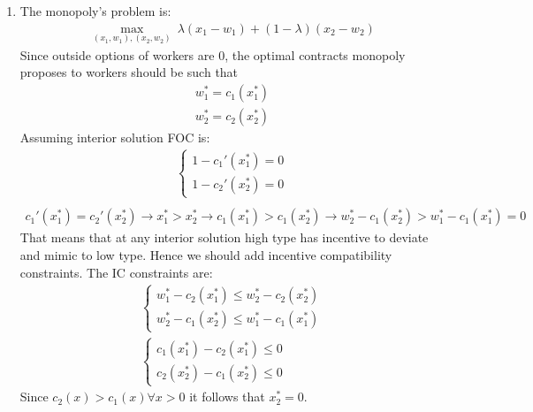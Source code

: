 \documentclass[a4paper]{article}
\begin{document}
\begin{enumerate}
	\item The monopoly's problem is:
	\begin{align*}
	\underset{(x_1, w_1), (x_2, w_2)}{\max}\ \lambda(x_1 - w_1) + (1 - \lambda)(x_2 - w_2)
	\end{align*}
	Since outside options of workers are 0, the optimal contracts monopoly proposes to workers should be such that
	\begin{align*}
	w_1^* = c_1(x_1^*)\\
	w_2^* = c_2(x_2^*)
	\end{align*}
	Assuming interior solution FOC is:
	\begin{align*}
	\begin{cases}
	1 - c_1'(x_1^*) = 0\\
	1 - c_2'(x_2^*) = 0
	\end{cases}\\
	\end{align*}
	\begin{align*}
	c_1'(x_1^*) = c_2'(x_2^*) \to x_1^* > x_2^* \to c_1(x_1^*) > c_1(x_2^*) \to w_2^* - c_1(x_2^*) > w_1^* - c_1(x_1^*) = 0
	\end{align*}
	That means that at any interior solution high type has incentive to deviate and mimic to low type. Hence we should add incentive compatibility constraints. The IC constraints are:
	\begin{align*}
	\begin{cases}
	w_1^* - c_2(x_1^*) \le w_2^* - c_2(x_2^*)\\
	w_2^* - c_1(x_2^*) \le w_1^* - c_1(x_1^*)
	\end{cases}\\
	\begin{cases}
	c_1(x_1^*) - c_2(x_1^*) \le 0\\
	c_2(x_2^*) - c_1(x_2^*) \le 0
	\end{cases}
	\end{align*}
	Since $c_2(x) > c_1(x) \forall x > 0$ it follows that $x_2^* = 0$.
\end{enumerate}
\end{document}
